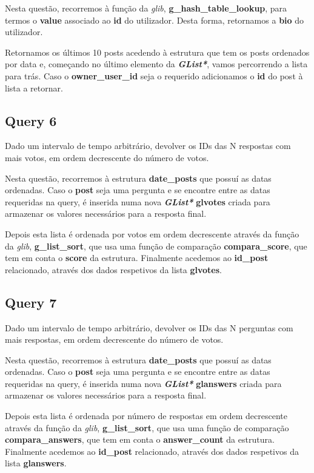 \documentclass[a4paper]{article}
\begin{document}
Nesta questão, recorremos à função da \textit{glib}, 
\textbf{g\_hash\_table\_lookup}, para termos o \textbf{value} 
associado ao \textbf{id} do utilizador. Desta forma, retornamos a 
\textbf{bio} do utilizador.

Retornamos os últimos 10 posts acedendo à estrutura que tem os posts
ordenados por data e, começando no último elemento da \textit{
\textbf{GList*}}, vamos percorrendo a lista para trás. Caso o 
\textbf{owner\_user\_id} seja o requerido adicionamos o \textbf{id} 
do post à lista a retornar.

\subsection{Query 6}

Dado um intervalo de tempo arbitrário, devolver os IDs das N respostas 
com mais votos, em ordem decrescente do número de votos.

Nesta questão, recorremos à estrutura \textbf{date\_posts} que possuí 
as datas ordenadas. Caso o \textbf{post} seja uma pergunta e
se encontre entre as datas requeridas na query, é inserida numa nova
\textit{\textbf{GList*}} \textbf{glvotes} criada para armazenar os 
valores necessários para a resposta final.

Depois esta lista é ordenada por votos em ordem decrescente através da 
função da \textit{glib}, \textbf{g\_list\_sort}, que usa uma função de 
comparação \textbf{compara\_score}, que tem em conta o \textbf{score}
da estrutura. Finalmente acedemos ao \textbf{id\_post} relacionado, 
através dos dados respetivos da lista \textbf{glvotes}.

\subsection{Query 7}

Dado um intervalo de tempo arbitrário, devolver os IDs das N perguntas 
com mais respostas, em ordem decrescente do número de votos.

Nesta questão, recorremos à estrutura \textbf{date\_posts} que possuí 
as datas ordenadas. Caso o \textbf{post} seja uma pergunta e
se encontre entre as datas requeridas na query, é inserida numa nova
\textit{\textbf{GList*}} \textbf{glanswers} criada para armazenar os 
valores necessários para a resposta final.

Depois esta lista é ordenada por número de respostas em ordem decrescente 
através da função da \textit{glib}, \textbf{g\_list\_sort}, que usa uma 
função de comparação \textbf{compara\_answers}, que tem em conta o 
\textbf{answer\_count} da estrutura. Finalmente acedemos ao 
\textbf{id\_post} relacionado, através dos dados respetivos da lista 
\textbf{glanswers}.
\end{document}
